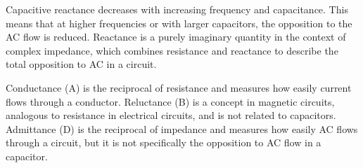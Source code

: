Capacitive reactance decreases with increasing frequency and capacitance. This means that at higher frequencies or with larger capacitors, the opposition to the AC flow is reduced. Reactance is a purely imaginary quantity in the context of complex impedance, which combines resistance and reactance to describe the total opposition to AC in a circuit.

Conductance (A) is the reciprocal of resistance and measures how easily current flows through a conductor. Reluctance (B) is a concept in magnetic circuits, analogous to resistance in electrical circuits, and is not related to capacitors. Admittance (D) is the reciprocal of impedance and measures how easily AC flows through a circuit, but it is not specifically the opposition to AC flow in a capacitor.

